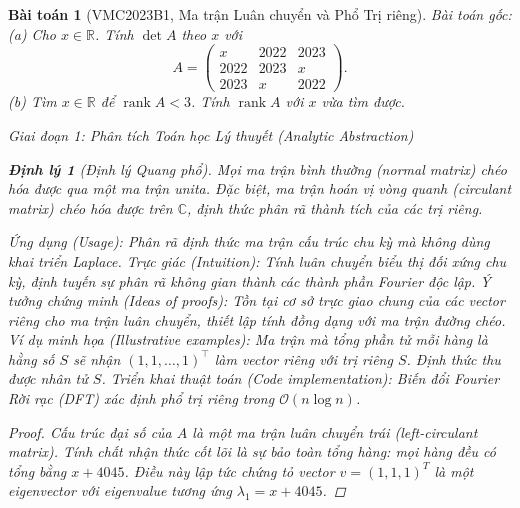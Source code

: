 \documentclass{article}
\newtheorem{baitoan}{Bài toán}
\newtheorem{dinhly}{Định lý}
\begin{document}
\begin{baitoan}[VMC2023B1, Ma trận Luân chuyển và Phổ Trị riêng]
 \emph{Bài toán gốc:} 
 (a) Cho $x\in\mathbb{R}$. Tính $\det A$ theo $x$ với
 \begin{equation*}
 A = \begin{pmatrix}
 x & 2022 & 2023\\2022 & 2023 & x\\2023 & x & 2022
 \end{pmatrix}.
 \end{equation*}
 (b) Tìm $x\in\mathbb{R}$ để $\operatorname{rank}A < 3$. Tính $\operatorname{rank}A$ với $x$ vừa tìm được.
 
\vspace{0.5em}\noindent\emph{Giai đoạn 1: Phân tích Toán học Lý thuyết (Analytic Abstraction)}
 
\begin{dinhly}[Định lý Quang phổ]\label{thm:dinh_ly_quang_pho}
Mọi ma trận bình thường (normal matrix) chéo hóa được qua một ma trận unita. Đặc biệt, ma trận hoán vị vòng quanh (circulant matrix) chéo hóa được trên $\mathbb{C}$, định thức phân rã thành tích của các trị riêng.
\end{dinhly}
\emph{Ứng dụng (Usage):} Phân rã định thức ma trận cấu trúc chu kỳ mà không dùng khai triển Laplace.
\emph{Trực giác (Intuition):} Tính luân chuyển biểu thị đối xứng chu kỳ, định tuyến sự phân rã không gian thành các thành phần Fourier độc lập.
\emph{Ý tưởng chứng minh (Ideas of proofs):} Tồn tại cơ sở trực giao chung của các vector riêng cho ma trận luân chuyển, thiết lập tính đồng dạng với ma trận đường chéo.
\emph{Ví dụ minh họa (Illustrative examples):} Ma trận mà tổng phần tử mỗi hàng là hằng số $S$ sẽ nhận $(1, 1, \dots, 1)^\top$ làm vector riêng với trị riêng $S$. Định thức thu được nhân tử $S$.
\emph{Triển khai thuật toán (Code implementation):} Biến đổi Fourier Rời rạc (DFT) xác định phổ trị riêng trong $\mathcal{O}(n \log n)$.

\begin{proof}
 Cấu trúc đại số của $A$ là một ma trận luân chuyển trái (left-circulant matrix). Tính chất nhận thức cốt lõi là sự bảo toàn tổng hàng: mọi hàng đều có tổng bằng $x + 4045$. Điều này lập tức chứng tỏ vector $v = (1, 1, 1)^T$ là một eigenvector với eigenvalue tương ứng $\lambda_1 = x + 4045$. 
 

\end{proof}
\end{baitoan}
\end{document}
